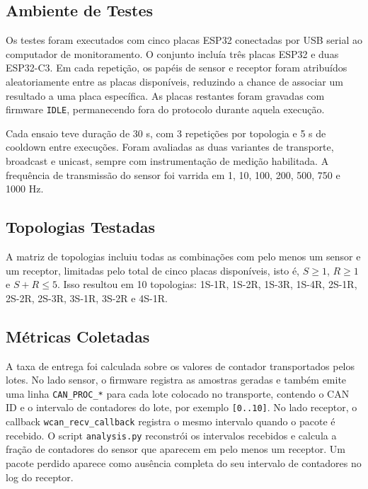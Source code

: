 \documentclass{article}
\begin{document}
    \subsection{Ambiente de Testes}

    Os testes foram executados com cinco placas ESP32 conectadas por USB serial ao computador de monitoramento. O conjunto incluía três placas ESP32 e duas ESP32-C3. Em cada repetição, os papéis de sensor e receptor foram atribuídos aleatoriamente entre as placas disponíveis, reduzindo a chance de associar um resultado a uma placa específica. As placas restantes foram gravadas com firmware \texttt{IDLE}, permanecendo fora do protocolo durante aquela execução.

    Cada ensaio teve duração de 30 s, com 3 repetições por topologia e 5 s de cooldown entre execuções. Foram avaliadas as duas variantes de transporte, broadcast e unicast, sempre com instrumentação de medição habilitada. A frequência de transmissão do sensor foi varrida em 1, 10, 100, 200, 500, 750 e 1000 Hz.

    \subsection{Topologias Testadas}

    A matriz de topologias incluiu todas as combinações com pelo menos um sensor e um receptor, limitadas pelo total de cinco placas disponíveis, isto é, \(S \geq 1\), \(R \geq 1\) e \(S + R \leq 5\). Isso resultou em 10 topologias: 1S-1R, 1S-2R, 1S-3R, 1S-4R, 2S-1R, 2S-2R, 2S-3R, 3S-1R, 3S-2R e 4S-1R.

    \subsection{Métricas Coletadas}

    A taxa de entrega foi calculada sobre os valores de contador transportados pelos lotes. No lado sensor, o firmware registra as amostras geradas e também emite uma linha \texttt{CAN_PROC_*} para cada lote colocado no transporte, contendo o CAN ID e o intervalo de contadores do lote, por exemplo \texttt{[0..10]}. No lado receptor, o callback \texttt{wcan_recv_callback} registra o mesmo intervalo quando o pacote é recebido. O script \texttt{analysis.py} reconstrói os intervalos recebidos e calcula a fração de contadores do sensor que aparecem em pelo menos um receptor. Um pacote perdido aparece como ausência completa do seu intervalo de contadores no log do receptor.
\end{document}
